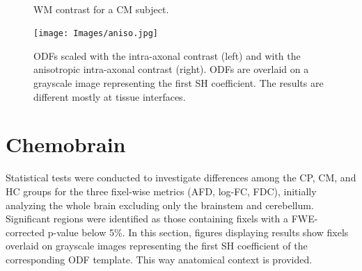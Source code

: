 \begin{figure}[h]
    \centering
     \\[1em] %
    \caption{WM contrast for a CM subject.}
    \label{fig:CM_10}
\end{figure}




\begin{figure}[H]
  \centering
  \texttt{[image: Images/aniso.jpg]} %
  \caption{ODFs scaled with the intra-axonal contrast (left) and with the anisotropic intra-axonal contrast (right). ODFs are overlaid on a grayscale image representing the first SH coefficient.  The results are different mostly at tissue interfaces.}
  \label{fig:aniso}
\end{figure}

\section{Chemobrain}
Statistical tests were conducted to investigate differences among the CP, CM, and HC groups for the three fixel-wise metrics (AFD, log-FC, FDC), initially analyzing the whole brain excluding only the brainstem and cerebellum. Significant regions were identified as those containing fixels with a FWE-corrected p-value below 5\%. In this section, figures displaying results show fixels overlaid on grayscale images representing the first SH coefficient of the corresponding ODF template. This way anatomical context is provided. 

